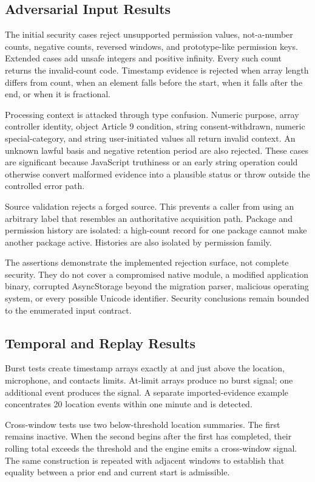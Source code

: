 \subsection{Adversarial Input Results}

The initial security cases reject unsupported permission values, not-a-number counts, negative counts, reversed windows, and prototype-like permission keys. Extended cases add unsafe integers and positive infinity. Every such count returns the invalid-count code. Timestamp evidence is rejected when array length differs from count, when an element falls before the start, when it falls after the end, or when it is fractional.

Processing context is attacked through type confusion. Numeric purpose, array controller identity, object Article 9 condition, string consent-withdrawn, numeric special-category, and string user-initiated values all return invalid context. An unknown lawful basis and negative retention period are also rejected. These cases are significant because JavaScript truthiness or an early string operation could otherwise convert malformed evidence into a plausible status or throw outside the controlled error path.

Source validation rejects a forged source. This prevents a caller from using an arbitrary label that resembles an authoritative acquisition path. Package and permission history are isolated: a high-count record for one package cannot make another package active. Histories are also isolated by permission family.

The assertions demonstrate the implemented rejection surface, not complete security. They do not cover a compromised native module, a modified application binary, corrupted AsyncStorage beyond the migration parser, malicious operating system, or every possible Unicode identifier. Security conclusions remain bounded to the enumerated input contract.

\subsection{Temporal and Replay Results}

Burst tests create timestamp arrays exactly at and just above the location, microphone, and contacts limits. At-limit arrays produce no burst signal; one additional event produces the signal. A separate imported-evidence example concentrates 20 location events within one minute and is detected.

Cross-window tests use two below-threshold location summaries. The first remains inactive. When the second begins after the first has completed, their rolling total exceeds the threshold and the engine emits a cross-window signal. The same construction is repeated with adjacent windows to establish that equality between a prior end and current start is admissible.

